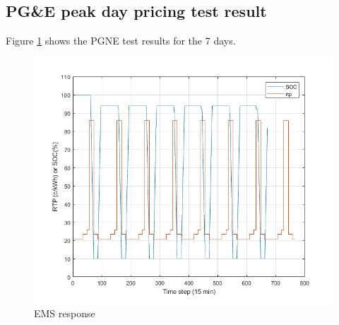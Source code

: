 \subsection{PG\&E peak day pricing test result}

Figure \ref{fig:EMS_7_PGNE} shows the PGNE test results for the 7 days.

\begin{figure}[!ht]
    \centering
    \includegraphics[width = \linewidth]{figs/PGNE_PEAK_100_7_24.png}
    \caption{EMS response}
    \label{fig:EMS_7_PGNE}
\end{figure}
